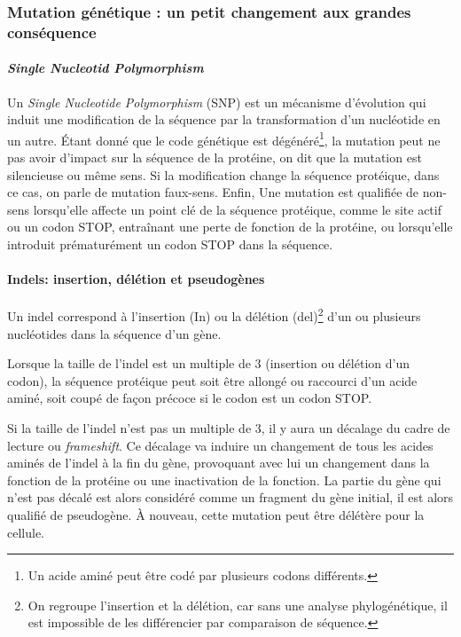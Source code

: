 \subsubsection{Mutation génétique : un petit changement aux grandes conséquence}
\paragraph{\textit{Single Nucleotid Polymorphism}}

Un \textit{Single Nucleotide Polymorphism} (SNP) est un mécanisme d'évolution qui induit une modification de la séquence par la transformation d'un nucléotide en un autre. Étant donné que le code génétique est dégénéré\footnote{Un acide aminé peut être codé par plusieurs codons différents.}, la mutation peut ne pas avoir d'impact sur la séquence de la protéine, on dit que la mutation est silencieuse ou même sens. Si la modification change la séquence protéique, dans ce cas, on parle de mutation faux-sens. Enfin, Une mutation est qualifiée de non-sens lorsqu'elle affecte un point clé de la séquence protéique, comme le site actif ou un codon STOP, entraînant une perte de fonction de la protéine, ou lorsqu'elle introduit prématurément un codon STOP dans la séquence.

\paragraph{Indels: insertion, délétion et pseudogènes}

Un indel correspond à l'insertion (In) ou la délétion (del)\footnote{On regroupe l'insertion et la délétion, car sans une analyse phylogénétique, il est impossible de les différencier par comparaison de séquence.} d'un ou plusieurs nucléotides dans la séquence d'un gène. 

Lorsque la taille de l'indel est un multiple de 3 (insertion ou délétion d'un codon), la séquence protéique peut soit être allongé ou raccourci d'un acide aminé, soit coupé de façon précoce si le codon est un codon STOP.

Si la taille de l'indel n'est pas un multiple de 3, il y aura un décalage du cadre de lecture ou \textit{frameshift}. Ce décalage va induire un changement de tous les acides aminés de l'indel à la fin du gène, provoquant avec lui un changement dans la fonction de la protéine ou une inactivation de la fonction. La partie du gène qui n'est pas décalé est alors considéré comme un fragment du gène initial, il est alors qualifié de pseudogène. À nouveau, cette mutation peut être délétère pour la cellule. 

